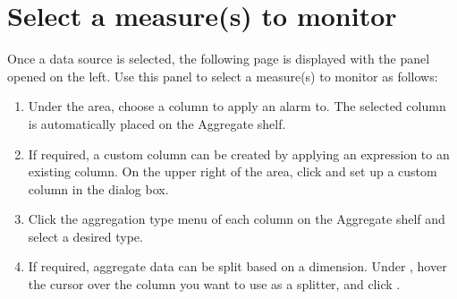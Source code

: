 \documentclass[letterpaper,10pt,english]{sphinxmanual}
\begin{document}
\section{Select a measure(s) to monitor}
\label{\detokenize{anomaly/part02/index:select-columns}}\label{\detokenize{anomaly/part02/index:id3}}
Once a data source is selected, the following page is displayed with the  panel opened on the left. Use this panel to select a measure(s) to monitor as follows:
\begin{enumerate}
\def\theenumi{\arabic{enumi}}
\def\labelenumi{\theenumi .}
\makeatletter\def\p@enumii{\p@enumi \theenumi .}\makeatother
\item {} 
Under the  area, choose a column to apply an alarm to. The selected column is automatically placed on the Aggregate shelf.
\begin{quote}

\begin{figure}[H]
\centering

\noindent{}
\end{figure}
\end{quote}

\item {} 
If required, a custom column can be created by applying an expression to an existing column. On the upper right of the  area, click  and set up a custom column in the dialog box.
\begin{quote}

\begin{figure}[H]
\centering

\noindent{}
\end{figure}
\end{quote}

\item {} 
Click the aggregation type menu of each column on the Aggregate shelf and select a desired type.
\begin{quote}

\begin{figure}[H]
\centering

\noindent{}
\end{figure}
\end{quote}

\item {} 
If required, aggregate data can be split based on a dimension. Under , hover the cursor over the column you want to use as a splitter, and click .
\begin{quote}


\end{quote}
\end{enumerate}
\end{document}
